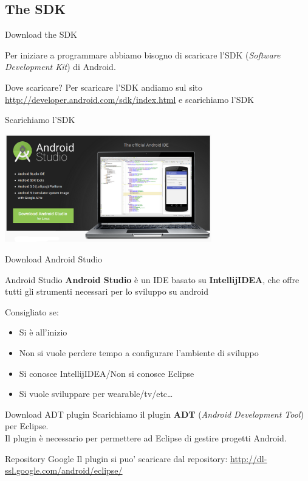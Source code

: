 \documentclass[xcolor=svgnames,11pt]{beamer}
\begin{document}
\subsection{The SDK}

\begin{frame}{Download the SDK}

Per iniziare a programmare abbiamo bisogno di scaricare l'SDK (\emph{Software Development Kit}) di Android.
\pause
\medskip
\begin{block}{Dove scaricare?}
Per scaricare l'SDK andiamo sul sito \url{http://developer.android.com/sdk/index.html} e scarichiamo l'SDK
\end{block}
\end{frame}

\begin{frame}{Scarichiamo l'SDK}
\begin{center}
\includegraphics[width=9cm]{studio.png}
\end{center}
\end{frame}

\begin{frame}{Download Android Studio}

\begin{block}{Android Studio}
\textbf{Android Studio} \`e un IDE basato su \textbf{IntellijIDEA}, che offre tutti gli strumenti necessari per lo sviluppo su android
\end{block}
\medskip
\pause

Consigliato se:
\begin{itemize}
\item Si \`e all'inizio
\item Non si vuole perdere tempo a configurare l'ambiente di sviluppo
\item Si conosce IntellijIDEA/Non si conosce Eclipse
\item Si vuole sviluppare per wearable/tv/etc\ldots
\end{itemize}
\end{frame}

\begin{frame}{Download ADT plugin}
Scarichiamo il plugin \textbf{ADT} (\emph{Android Development Tool}) per Eclipse.\\
\pause
\medskip
Il plugin \`e necessario per permettere ad Eclipse di gestire progetti Android.
\pause
\medskip
\begin{block}{Repository Google}
Il plugin si puo' scaricare dal repository: \url{http://dl-ssl.google.com/android/eclipse/}
\end{block}
\begin{center}
\end{center}
\end{frame}
\end{document}
